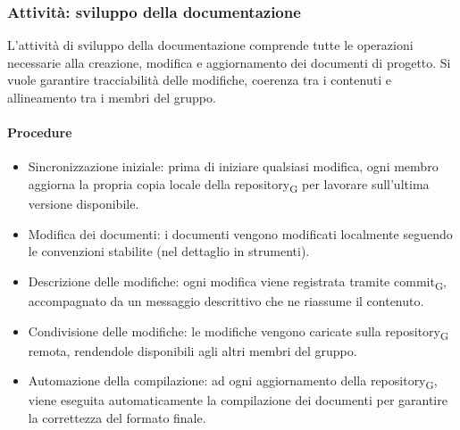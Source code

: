 \documentclass[11pt,a4paper]{article}
\newcommand{\gls}[1]{#1\textsubscript{G}}
\begin{document}
\subsubsection{Attività: sviluppo della documentazione}
L’attività di sviluppo della documentazione comprende tutte le operazioni necessarie alla creazione, modifica e aggiornamento dei documenti di progetto.
Si vuole garantire tracciabilità delle modifiche, coerenza tra i contenuti e allineamento tra i membri del gruppo.

\paragraph{Procedure}
\begin{itemize}
\item Sincronizzazione iniziale: prima di iniziare qualsiasi modifica, ogni membro aggiorna la propria copia locale della \gls{repository} per lavorare sull’ultima versione disponibile.
\item Modifica dei documenti: i documenti vengono modificati localmente seguendo le convenzioni stabilite (nel dettaglio in strumenti).
\item Descrizione delle modifiche: ogni modifica viene registrata tramite \gls{commit}, accompagnato da un messaggio descrittivo che ne riassume il contenuto.
\item Condivisione delle modifiche: le modifiche vengono caricate sulla \gls{repository} remota, rendendole disponibili agli altri membri del gruppo.

\item Automazione della compilazione: ad ogni aggiornamento della \gls{repository}, viene eseguita automaticamente la compilazione dei documenti per garantire la correttezza del formato finale.
\end{itemize}
\end{document}
